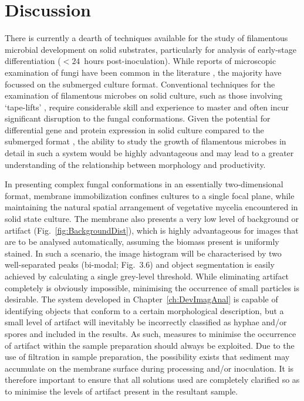 \section{Discussion}

There is currently a dearth of techniques available for the study of filamentous microbial development on solid substrates, particularly for analysis of early-stage differentiation ($< 24$~hours post-inoculation). While reports of microscopic examination of fungi have been common in the literature \cite{cox1998}, the majority have focussed on the submerged culture format. Conventional techniques for the examination of filamentous microbes on solid culture, such as those involving \lq tape-lifts' \cite{harris2000,rodriguez-tudela1991}, require considerable skill and experience to master and often incur significant disruption to the fungal conformations. Given the potential for differential gene and protein expression in solid culture compared to the submerged format \cite{ishida1998,oda2006,tebiesebeke2002}, the ability to study the growth of filamentous microbes in detail in such a system would be highly advantageous and may lead to a greater understanding of the relationship between morphology and productivity.

In presenting complex fungal conformations in an essentially two-dimensional format, membrane immobilization confines cultures to a single focal plane, while maintaining the natural spatial arrangement of vegetative mycelia encountered in solid state culture. The membrane also presents a very low level of background or artifact (Fig.~\ref{fig:BackgroundDist}), which is highly advantageous for images that are to be analysed automatically, assuming the biomass present is uniformly stained. In such a scenario, the image histogram will be characterised by two well-separated peaks (bi-modal; Fig.~3.6) and object segmentation is easily achieved by calculating a single grey-level threshold. While eliminating artifact completely is obviously impossible, minimising the occurrence of small particles is desirable. The system developed in Chapter~\ref{ch:DevImagAnal} is capable of identifying objects that conform to a certain morphological description, but a small level of artifact will inevitably be incorrectly classified as hyphae and/or spores and included in the results. As such, measures to minimise the occurrence of artifact within the sample preparation should always be exploited. Due to the use of filtration in sample preparation, the possibility exists that sediment may accumulate on the membrane surface during processing and/or inoculation. It is therefore important to ensure that all solutions used are completely clarified so as to minimise the levels of artifact present in the resultant sample.

